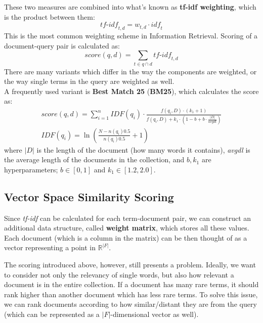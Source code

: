 These two measures are combined into what's known as \textbf{tf-idf weighting}, which is the product between them:
\begin{equation*}
    \textit{tf-idf}_{t,d} = w_{t,d} \cdot \textit{idf}_t
\end{equation*}
This is the most common weighting scheme in Information Retrieval. Scoring of a document-query pair is calculated as:
\begin{equation*}
    \textit{score}(q,d) = \sum_{t \in q \cap d} \textit{tf-idf}_{t,d}
\end{equation*}
There are many variants which differ in the way the components are weighted, or the way single terms in the query are weighted as well. \\
A frequently used variant is \textbf{Best Match 25} (\textbf{BM25}), which calculates the score as:
\begin{gather*}
    \textit{score}(q,d) = \sum_{i=1}^n IDF(q_i) \cdot \frac{f(q_i, D) \cdot (k_1 + 1)}{f(q_i, D) + k_1 \cdot (1 - b + b \cdot \frac{|D|}{\textit{avgdl}})} \\
    IDF(q_i) = \ln \left( \frac{N - n(q_i)  0.5}{n(q_i)  0.5} + 1 \right)
\end{gather*}
where $|D|$ is the length of the document (how many words it contains), \textit{avgdl} is the average length of the documents in the collection, and $b, k_1$ are hyperparameters; $b \in [0,1]$ and $k_1 \in [1.2,2.0]$.

\subsection{Vector Space Similarity Scoring}

Since \textit{tf-idf} can be calculated for each term-document pair, we can construct an additional data structure, called \textbf{weight matrix}, which stores all these values. Each document (which is a column in the matrix) can be then thought of as a vector representing a point in $\mathbb{R}^{|F|}$.

The scoring introduced above, however, still presents a problem. Ideally, we want to consider not only the relevancy of single words, but also how relevant a document is in the entire collection. If a document has many rare terms, it should rank higher than another document which has less rare terms. To solve this issue, we can rank  documents according to how similar/distant they are from the query (which can be represented as a $|F|$-dimensional vector as well).

